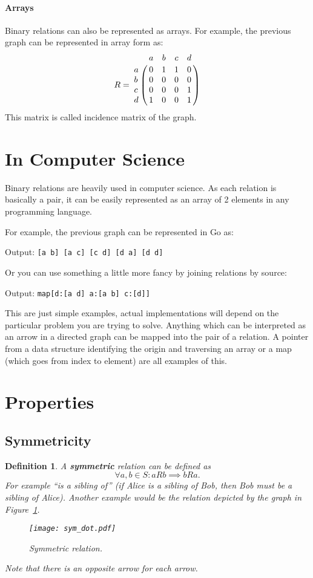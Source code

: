 \documentclass[11pt]{article}
\theoremstyle{plain}
\newtheorem{defn}{Definition}
\theoremstyle{definition}
\begin{document}
\paragraph{Arrays} Binary relations can also be represented as arrays.
For example,
the previous graph can be represented in array form as:
\begin{equation*}
  R = \bordermatrix{~ & a & b & c & d \cr
  a & 0 & 1 & 1 & 0 \cr
  b & 0 & 0 & 0 & 0 \cr
  c & 0 & 0 & 0 & 1 \cr
d & 1 & 0 & 0 & 1 \cr}
\end{equation*}
This matrix is called incidence matrix of the graph.

\section{In Computer Science}

Binary relations are heavily used in computer science.
As each relation is basically a pair,
it can be easily represented as an array of 2 elements in any programming language.

For example, the previous graph can be represented in Go as:



Output: \verb+[a b] [a c] [c d] [d a] [d d]+

Or you can use something a little more fancy by joining relations by source:



Output: \verb+map[d:[a d] a:[a b] c:[d]]+

This are just simple examples,
actual implementations will depend on the particular problem you are trying to solve.
Anything which can be interpreted as an arrow in a directed graph can be mapped into the pair of a relation.
A pointer from a data structure identifying the origin and  traversing an array or a map (which goes from index to element) are all examples of this.

\section{Properties}

\subsection{Symmetricity}

\begin{defn}
  A \textbf{symmetric} relation can be defined as
  \[ \forall a, b \in S: aRb \implies bRa .\]
  For example ``is a sibling of'' (if Alice is a sibling of Bob, then Bob must be a sibling of Alice).
  Another example would be the relation depicted by the graph in Figure~\ref{fig:sym}.
  \begin{figure}[th!]
    \centering
    \texttt{[image: sym\_dot.pdf]}
    \caption{Symmetric relation.\label{fig:sym}}
  \end{figure}
  Note that there is an opposite arrow for each arrow.
\end{defn}
\end{document}
